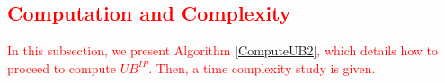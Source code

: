 \documentclass[jair,twoside,11pt,theapa]{article}
\newcommand{\major}[1]{\textcolor{red}{#1}}
\begin{document}






\subsection{\major{Computation and Complexity}}
\label{algoComparison}

\major{In this subsection, we present Algorithm \ref{ComputeUB2}, which details how to proceed to compute $UB^{IP}$. Then, a time complexity study is given.}
\end{document}
